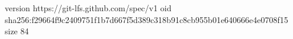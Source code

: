 version https://git-lfs.github.com/spec/v1
oid sha256:f29664f9c2409751f1b7d667f5d389c318b91c8cb955b01e640666e4e0708f15
size 84
